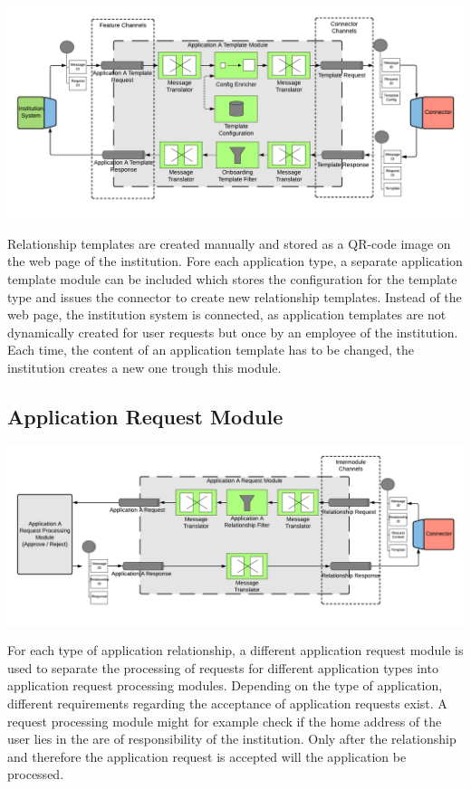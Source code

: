 \begin{center}
    \includegraphics[scale=0.5]{Diagrams/Integration Architecture 2/Technological Integration/4. Application Template Module.pdf}
\end{center}

Relationship templates are created manually and stored as a QR-code image on the web page of the institution. Fore each application type, a separate application template module can be included which stores the configuration for the template type and issues the connector to create new relationship templates. Instead of the web page, the institution system is connected, as application templates are not dynamically created for user requests but once by an employee of the institution. Each time, the content of an application template has to be changed, the institution creates a new one trough this module.

\subsection{Application Request Module}

\begin{center}
    \includegraphics[scale=0.5]{Diagrams/Integration Architecture 2/Technological Integration/5. Application Request Module.pdf}
\end{center}

For each type of application relationship, a different application request module is used to separate the processing of requests for different application types into application request processing modules. Depending on the type of application, different requirements regarding the acceptance of application requests exist. A request processing module might for example check if the home address of the user lies in the are of responsibility of the institution. Only after the relationship and therefore the application request is accepted will the application be processed.

